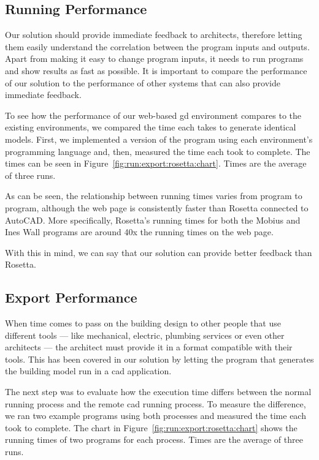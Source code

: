 \subsection{Running Performance}
Our solution should provide immediate feedback to architects, therefore letting them easily understand the correlation between the program inputs and outputs\cite{Leitao2014illustrated}.
Apart from making it easy to change program inputs, it needs to run programs and show results as fast as possible.
It is important to compare the performance of our solution to the performance of other systems that can also provide immediate feedback.

To see how the performance of our web-based \gls{gd} environment compares to the existing environments, we compared the time each takes to generate identical models.
First, we implemented a version of the program using each environment's programming language and, then, measured the time each took to complete.
The times can be seen in Figure~\ref{fig:run:export:rosetta:chart}.
Times are the average of three runs.

As can be seen, the relationship between running times varies from program to program, although the web page is consistently faster than Rosetta connected to AutoCAD.
More specifically, Rosetta's running times for both the Mobius and Ines Wall programs are around 40x the running times on the web page.

With this in mind, we can say that our solution can provide better feedback than Rosetta.



\subsection{Export Performance}
When time comes to pass on the building design to other people that use different tools --- like mechanical, electric, plumbing services or even other architects --- the architect must provide it in a format compatible with their tools.
This has been covered in our solution by letting the program that generates the building model run in a \gls{cad} application.

The next step was to evaluate how the execution time differs between the normal running process and the remote \gls{cad} running process.
To measure the difference, we ran two example programs using both processes and measured the time each took to complete.
The chart in Figure~\ref{fig:run:export:rosetta:chart} shows the running times of two programs for each process.
Times are the average of three runs.

